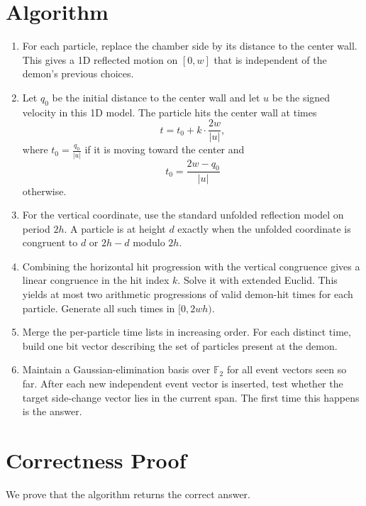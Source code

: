 \documentclass[11pt]{article}
\begin{document}
\section*{Algorithm}

\begin{enumerate}[leftmargin=*]
    \item For each particle, replace the chamber side by its distance to the center wall. This gives a 1D reflected motion on $[0,w]$ that is independent of the demon's previous choices.

    \item Let $q_0$ be the initial distance to the center wall and let $u$ be the signed velocity in this 1D model. The particle hits the center wall at times
    \[
    t = t_0 + k \cdot \frac{2w}{|u|},
    \]
    where $t_0 = \frac{q_0}{|u|}$ if it is moving toward the center and
    \[
    t_0 = \frac{2w-q_0}{|u|}
    \]
    otherwise.

    \item For the vertical coordinate, use the standard unfolded reflection model on period $2h$. A particle is at height $d$ exactly when the unfolded coordinate is congruent to $d$ or $2h-d$ modulo $2h$.

    \item Combining the horizontal hit progression with the vertical congruence gives a linear congruence in the hit index $k$. Solve it with extended Euclid. This yields at most two arithmetic progressions of valid demon-hit times for each particle. Generate all such times in $[0,2wh)$.

    \item Merge the per-particle time lists in increasing order. For each distinct time, build one bit vector describing the set of particles present at the demon.

    \item Maintain a Gaussian-elimination basis over $\mathbb{F}_2$ for all event vectors seen so far. After each new independent event vector is inserted, test whether the target side-change vector lies in the current span. The first time this happens is the answer.
\end{enumerate}

\section*{Correctness Proof}

We prove that the algorithm returns the correct answer.
\end{document}
